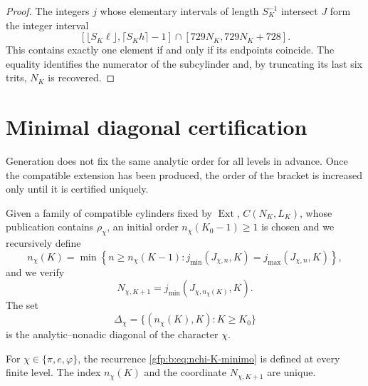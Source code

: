 \begin{proof}
The integers \(j\) whose elementary intervals of length \(S_K^{-1}\)
intersect \(J\) form the integer interval
\[
 \left[
 \lfloor S_K\ell\rfloor,
 \lceil S_Kh\rceil-1
 \right]\cap
 [729N_K,729N_K+728].
\]
This contains exactly one element if and only if its endpoints coincide.
The equality identifies the numerator of the subcylinder and, by truncating its last
six trits, \(N_K\) is recovered.
\end{proof}

\section{Minimal diagonal certification}

Generation does not fix the same analytic order for all
levels in advance. Once the compatible extension has been produced, the order of the
bracket is increased only until it is certified uniquely.

\begin{definition}
\label{gfp:b:def:recurrencia-diagonal-constantes}
Given a family of compatible cylinders fixed by \(\operatorname{Ext}\),
\(C(N_K,L_K)\), whose publication contains \(\rho_\chi\), an initial order
\(n_\chi(K_0-1)\geq1\) is chosen and we recursively define
\begin{equation}
 n_\chi(K)=
 \min\left\{
 n\geq n_\chi(K-1):
 j_{\min}(J_{\chi,n},K)=j_{\max}(J_{\chi,n},K)
 \right\},
 \label{gfp:b:eq:nchi-K-minimo}
\end{equation}
and we verify
\begin{equation}
 N_{\chi,K+1}
 =j_{\min}(J_{\chi,n_\chi(K)},K).
 \label{gfp:b:eq:Nchi-K-mas-uno}
\end{equation}
The set
\[
 \Delta_\chi=
 \{(n_\chi(K),K):K\geq K_0\}
\]
is the analytic--nonadic diagonal of the character \(\chi\).
\end{definition}

\begin{theorem}
\label{gfp:b:thm:existencia-unicidad-diagonal}
For \(\chi\in\{\pi,e,\varphi\}\), the recurrence
\eqref{gfp:b:eq:nchi-K-minimo} is defined at every finite level. The index
\(n_\chi(K)\) and the coordinate \(N_{\chi,K+1}\) are unique.
\end{theorem}

